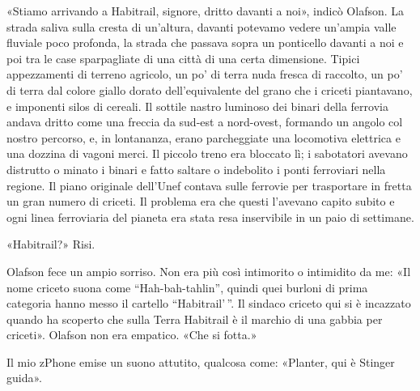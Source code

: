 «Stiamo arrivando a Habitrail, signore, dritto davanti a noi», indicò
Olafson. La strada saliva sulla cresta di un'altura, davanti potevamo
vedere un'ampia valle fluviale poco profonda, la strada che passava
sopra un ponticello davanti a noi e poi tra le case sparpagliate di una
città di una certa dimensione. Tipici appezzamenti di terreno agricolo,
un po' di terra nuda fresca di raccolto, un po' di terra dal colore
giallo dorato dell'equivalente del grano che i criceti piantavano, e
imponenti silos di cereali. Il sottile nastro luminoso dei binari della
ferrovia andava dritto come una freccia da sud-est a nord-ovest,
formando un angolo col nostro percorso, e, in lontananza, erano
parcheggiate una locomotiva elettrica e una dozzina di vagoni merci. Il
piccolo treno era bloccato lì; i sabotatori avevano distrutto o minato i
binari e fatto saltare o indebolito i ponti ferroviari nella regione. Il
piano originale dell'Unef contava sulle ferrovie per trasportare in
fretta un gran numero di criceti. Il problema era che questi l'avevano
capito subito e ogni linea ferroviaria del pianeta era stata resa
inservibile in un paio di settimane.

«Habitrail?» Risi.

Olafson fece un ampio sorriso. Non era più così intimorito o intimidito
da me: «Il nome criceto suona come ``Hah-bah-tahlin'', quindi quei
burloni di prima categoria hanno messo il cartello ``Habitrail'\,''. Il
sindaco criceto qui si è incazzato quando ha scoperto che sulla Terra
Habitrail è il marchio di una gabbia per criceti». Olafson non era
empatico. «Che si fotta.»

\hfill\break

Il mio zPhone emise un suono attutito, qualcosa come: «Planter, qui è
Stinger guida».

